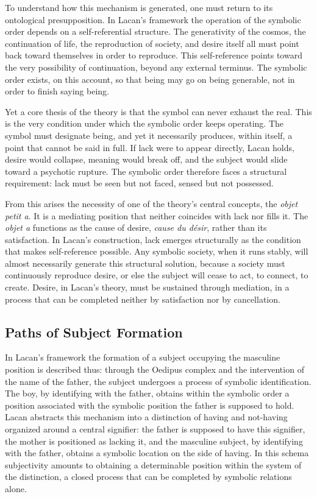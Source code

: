 \documentclass[11pt,a4paper]{article}
\begin{document}
To understand how this mechanism is generated, one must return to its ontological presupposition. In Lacan's framework the operation of the symbolic order depends on a self-referential structure. The generativity of the cosmos, the continuation of life, the reproduction of society, and desire itself all must point back toward themselves in order to reproduce. This self-reference points toward the very possibility of continuation, beyond any external terminus. The symbolic order exists, on this account, so that being may go on being generable, not in order to finish saying being.

Yet a core thesis of the theory is that the symbol can never exhaust the real. This is the very condition under which the symbolic order keeps operating. The symbol must designate being, and yet it necessarily produces, within itself, a point that cannot be said in full. If lack were to appear directly, Lacan holds, desire would collapse, meaning would break off, and the subject would slide toward a psychotic rupture. The symbolic order therefore faces a structural requirement: lack must be seen but not faced, sensed but not possessed.

From this arises the necessity of one of the theory's central concepts, the \textit{objet petit a}. It is a mediating position that neither coincides with lack nor fills it. The \textit{objet a} functions as the cause of desire, \textit{cause du désir}, rather than its satisfaction. In Lacan's construction, lack emerges structurally as the condition that makes self-reference possible. Any symbolic society, when it runs stably, will almost necessarily generate this structural solution, because a society must continuously reproduce desire, or else the subject will cease to act, to connect, to create. Desire, in Lacan's theory, must be sustained through mediation, in a process that can be completed neither by satisfaction nor by cancellation.

\subsection{Paths of Subject Formation}

In Lacan's framework the formation of a subject occupying the masculine position is described thus: through the Oedipus complex and the intervention of the name of the father, the subject undergoes a process of symbolic identification. The boy, by identifying with the father, obtains within the symbolic order a position associated with the symbolic position the father is supposed to hold. Lacan abstracts this mechanism into a distinction of having and not-having organized around a central signifier: the father is supposed to have this signifier, the mother is positioned as lacking it, and the masculine subject, by identifying with the father, obtains a symbolic location on the side of having. In this schema subjectivity amounts to obtaining a determinable position within the system of the distinction, a closed process that can be completed by symbolic relations alone.
\end{document}
